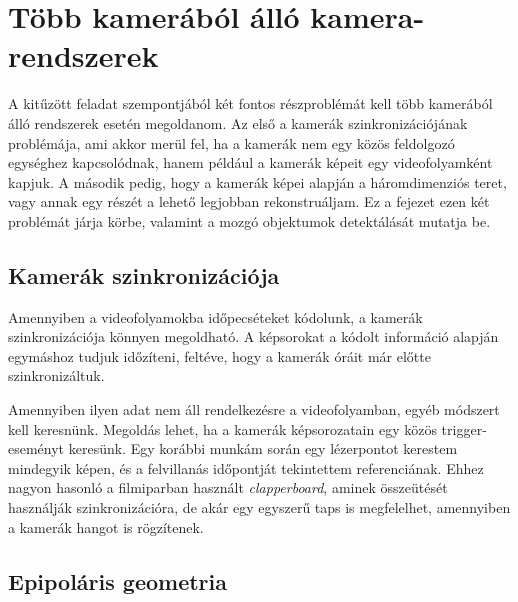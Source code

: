 \chapter{Több kamerából álló kamera-rendszerek \label{chapter2}}

A kitűzött feladat szempontjából két fontos részproblémát kell több kamerából álló rendszerek esetén megoldanom. Az első a kamerák szinkronizációjának problémája, ami akkor merül fel, ha a kamerák nem egy közös feldolgozó egységhez kapcsolódnak, hanem például a kamerák képeit egy videofolyamként kapjuk. A második pedig, hogy a kamerák képei alapján a háromdimenziós teret, vagy annak egy részét a lehető legjobban rekonstruáljam. Ez a fejezet ezen két problémát járja körbe, valamint a mozgó objektumok detektálását mutatja be.


\section{Kamerák szinkronizációja}


Amennyiben a videofolyamokba időpecséteket kódolunk, a kamerák szinkronizációja könnyen megoldható. A képsorokat a kódolt információ alapján egymáshoz tudjuk időzíteni, feltéve, hogy a kamerák óráit már előtte szinkronizáltuk.

Amennyiben ilyen adat nem áll rendelkezésre a videofolyamban, egyéb módszert kell keresnünk. Megoldás lehet, ha a kamerák képsorozatain egy közös trigger-eseményt keresünk. Egy korábbi munkám során \cite{onlab-1} egy lézerpontot kerestem mindegyik képen, és a felvillanás időpontját tekintettem referenciának. Ehhez nagyon hasonló a filmiparban használt \textit{clapperboard}, aminek összeütését használják szinkronizációra, de akár egy egyszerű taps is megfelelhet, amennyiben a kamerák hangot is rögzítenek.


\section{Epipoláris geometria \label{sec:epipolar}}

